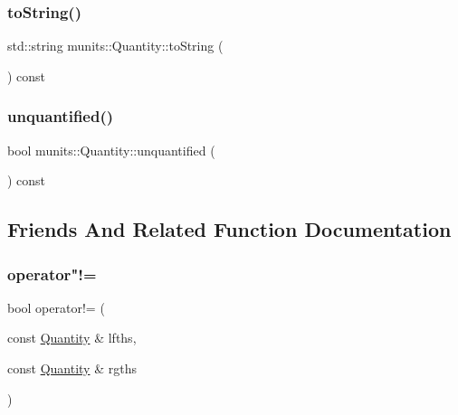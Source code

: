 \mbox{\label{classmunits_1_1_quantity_a3f09b8e8dbd47f32a21f94591508c0fe}} 
\subsubsection{\texorpdfstring{to\+String()}{toString()}}
{\footnotesize\ttfamily std\+::string munits\+::\+Quantity\+::to\+String (\begin{DoxyParamCaption}{ }\end{DoxyParamCaption}) const\hspace{0.3cm}{\ttfamily [inline]}}

\mbox{\label{classmunits_1_1_quantity_a09ed96601cab6f56278e3bf44dc82b70}} 
\subsubsection{\texorpdfstring{unquantified()}{unquantified()}}
{\footnotesize\ttfamily bool munits\+::\+Quantity\+::unquantified (\begin{DoxyParamCaption}{ }\end{DoxyParamCaption}) const}



\subsection{Friends And Related Function Documentation}
\mbox{\label{classmunits_1_1_quantity_aa57bf85906856611bd00e12150faf573}} 
\subsubsection{\texorpdfstring{operator"!=}{operator!=}}
{\footnotesize\ttfamily bool operator!= (\begin{DoxyParamCaption}\item[{const \hyperlink{classmunits_1_1_quantity}{Quantity} \&}]{lfths,  }\item[{const \hyperlink{classmunits_1_1_quantity}{Quantity} \&}]{rgths }\end{DoxyParamCaption})\hspace{0.3cm}{\ttfamily [friend]}}

